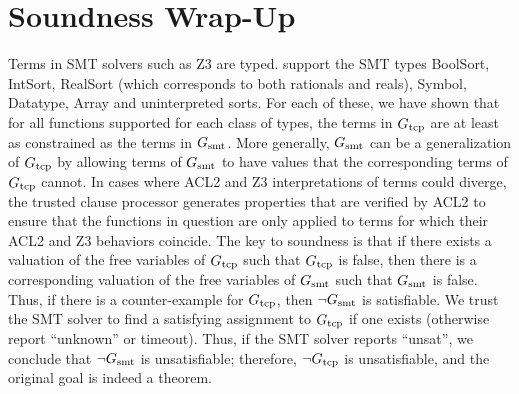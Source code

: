 \section{Soundness Wrap-Up}\label{sec:soundconcl}
Terms in \acs{SMT} solvers such as Z3 are typed.  \smtlink{} support the
\acs{SMT} types BoolSort, IntSort, RealSort (which corresponds to both rationals
and reals), Symbol, Datatype, Array and uninterpreted sorts.
For each of these, we have shown that for all functions supported for each
class of types, the terms in $G_{\mathrm{tcp}}$ are at least as constrained as the terms in
$G_{\mathrm{smt}}$.
More generally, $G_{\mathrm{smt}}$ can be a generalization of $G_{\mathrm{tcp}}$ by allowing terms of
$G_{\mathrm{smt}}$ to have values that the corresponding terms of $G_{\mathrm{tcp}}$ cannot.
In cases where ACL2 and Z3 interpretations of terms could diverge, the
trusted clause processor generates properties that are verified by ACL2 to
ensure that the functions in question are only applied to terms for which their
ACL2 and Z3 behaviors coincide.
The key to soundness is that if there exists a valuation of the free variables
of $G_{\mathrm{tcp}}$ such that $G_{\mathrm{tcp}}$ is false, then there is a corresponding valuation
of the free variables of $G_{\mathrm{smt}}$ such that $G_{\mathrm{smt}}$ is false.  Thus, if there
is a counter-example for $G_{\mathrm{tcp}}$, then $\neg G_{\mathrm{smt}}$ is satisfiable.  We trust
the \acs{SMT} solver to find a satisfying assignment to $G_{\mathrm{tcp}}$ if one exists
(otherwise report ``unknown'' or timeout).  Thus, if the SMT solver reports
``unsat'', we conclude that $\neg G_{\mathrm{smt}}$ is unsatisfiable; therefore, $\neg G_{\mathrm{tcp}}$
is unsatisfiable, and the original goal is indeed a theorem.

\endinput
